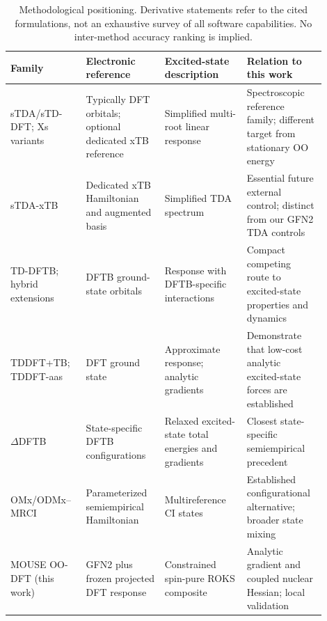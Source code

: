 \begin{table}[!htbp]
\centering\footnotesize
\caption{Methodological positioning. Derivative statements refer to the cited formulations, not an exhaustive survey of all software capabilities. No inter-method accuracy ranking is implied.}\label{tab:positioning}
\setlength{\tabcolsep}{4pt}
\begin{tabular}{p{0.20\linewidth}p{0.23\linewidth}p{0.24\linewidth}p{0.23\linewidth}}
\toprule
Family & Electronic reference & Excited-state description & Relation to this work\\
\midrule
sTDA/sTD-DFT; Xs variants\cite{tda,stdft2014,std22026} & Typically DFT orbitals; optional dedicated xTB reference & Simplified multi-root linear response & Spectroscopic reference family; different target from stationary OO energy\\[4pt]
sTDA-xTB\cite{stdaxtb2016} & Dedicated xTB Hamiltonian and augmented basis & Simplified TDA spectrum & Essential future external control; distinct from our GFN2 TDA controls\\[4pt]
TD-DFTB; hybrid extensions\cite{dftb2025,hybriddftb2025} & DFTB ground-state orbitals & Response with DFTB-specific interactions & Compact competing route to excited-state properties and dynamics\\[4pt]
TDDFT+TB; TDDFT-aas\cite{tbgrad2023,aas2024} & DFT ground state & Approximate response; analytic gradients & Demonstrate that low-cost analytic excited-state forces are established\\[4pt]
$\Delta$DFTB\cite{deltadftb2016,dftb2025} & State-specific DFTB configurations & Relaxed excited-state total energies and gradients & Closest state-specific semiempirical precedent\\[4pt]
OMx/ODMx--MRCI\cite{omxexc2016,odmx2019} & Parameterized semiempirical Hamiltonian & Multireference CI states & Established configurational alternative; broader state mixing\\[4pt]
MOUSE OO-DFT (this work) & GFN2 plus frozen projected DFT response & Constrained spin-pure ROKS composite & Analytic gradient and coupled nuclear Hessian; local validation\\
\bottomrule
\end{tabular}
\end{table}
